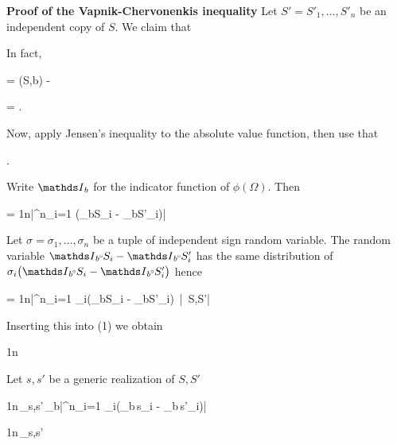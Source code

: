 \documentclass[scombinatorics.tex]{subfiles}
\begin{document}
\textbf{Proof of the Vapnik-Chervonenkis inequality}
Let $S'=S'_1,\dots,S'_n$ be an independent copy of $S$.
We claim that

{\le}
{\Ex{}}

In fact,

{=}
{\Fr(S,b) - \Ex\big[\Fr(S',b)\big]}

\ceq{}
{=}
{\Ex{}.}

Now, apply Jensen's inequality to the absolute value function, then use that 

{\le}
{\Ex{}.}

Write $\Indicator_b$ for the indicator function of $\phi(\Omega)$.
Then

{=}
{\frac1n\bigg|\sum^n_{i=1} \Big(\Indicator_b\smallcirc S_i -  \Indicator_b\smallcirc S'_i\Big)\bigg|}

Let $\sigma=\sigma_1,\dots,\sigma_n$ be a tuple of independent sign random variable.
The random variable $\Indicator_b\smallcirc S_i -  \Indicator_b\smallcirc S'_i$ has the same distribution of $\sigma_i\big(\Indicator_b\smallcirc S_i -  \Indicator_b\smallcirc S'_i\big)$ hence

\ceq{}
{=}
{\frac1n\Ex\bigg|\sum^n_{i=1} \sigma_i\Big(\Indicator_b\smallcirc S_i -  \Indicator_b\smallcirc S'_i\Big)\ \Big|\ S,S'\bigg|}

Inserting this into (1) we obtain


{\le}
{\frac1n\,\Ex\bigg[\sup_{b\in\V}\Ex\bigg|\sum^n_{i=1} \sigma_i\Big(\Indicator_b\smallcirc S_i -  \Indicator_b\smallcirc S'_i\Big)\ \Big|\ S,S'\bigg|\bigg]}

Let $s,s'$ be a generic realization of $S,S'$


\ceq{}
{\le}
{\frac1n\,\sup_{s,s'}\,\sup_{b\in\V}\Ex\bigg|\sum^n_{i=1} \sigma_i\big(\Indicator_b\,s_i -  \Indicator_b\,s'_i\big)\bigg|}

\ceq{}
{\le}
{\frac1n\,\sup_{s,s'}\Ex\bigg[\sup_{b\in\V}\bigg|\sum^n_{i=1} \sigma_i\big(\Indicator_b\,s_i -  \Indicator_b\,s'_i\big)\bigg|\bigg]}
\end{document}
